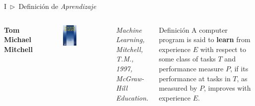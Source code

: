 \documentclass[xcolor=dvipsnames]{beamer}
\begin{document}
    \begin{frame}{I~$\rhd$~Definición de \textit{Aprendizaje}}
    \begin{columns}
            \textbf{Tom Michael Mitchell}
            \begin{figure}
            \centering
            \includegraphics[width=0.6\textwidth]{imgs/sec1/213030.jpg}
            \end{figure}
            \textit{\scriptsize{Machine Learning, Mitchell, T.M., 1997, McGraw-Hill Education.}}
            \begin{block}{Definición}
            A computer program is said to \textbf{learn} from experience \( E \) with respect to some class of tasks \( T \) and performance measure \( P \), if its performance at tasks in \( T \), as measured by \( P \), improves with experience \( E \).
            \end{block}
    \end{columns}    
    \end{frame}
\end{document}
